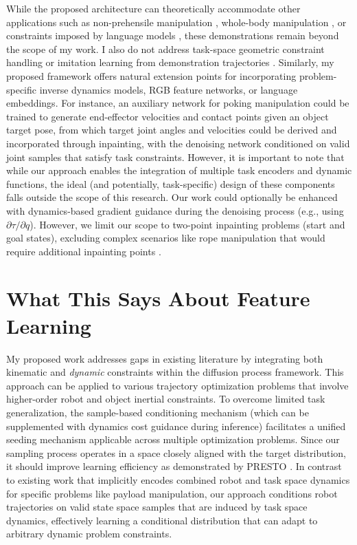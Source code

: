 While the proposed architecture can theoretically accommodate other applications such as non-prehensile manipulation \cite{pasricha2022pokerrt}, whole-body manipulation \cite{briscoe2024exploring}, or constraints imposed by language models \cite{ha2023scaling}, these demonstrations remain beyond the scope of my work. I also do not address task-space geometric constraint handling \cite{kingston2018sampling} or imitation learning from demonstration trajectories \cite{chi2023diffusion}.
Similarly, my proposed framework offers natural extension points for incorporating problem-specific inverse dynamics models, RGB feature networks, or language embeddings. For instance, an auxiliary network for poking manipulation could be trained to generate end-effector velocities and contact points given an object target pose, from which target joint angles and velocities could be derived and incorporated through inpainting, with the denoising network conditioned on valid joint samples that satisfy task constraints. However, it is important to note that while our approach enables the integration of multiple task encoders and dynamic functions, the ideal (and potentially, task-specific) design of these components falls outside the scope of this research.
Our work could optionally be enhanced with dynamics-based gradient guidance during the denoising process (e.g., using $\partial \tau / \partial q$). However, we limit our scope to two-point inpainting problems (start and goal states), excluding complex scenarios like rope manipulation that would require additional inpainting points \cite{zhang2021robots}.

\section{What This Says About Feature Learning}
\label{sec:seeding:features}

My proposed work addresses gaps in existing literature by integrating both kinematic and \textsl{dynamic} constraints within the diffusion process framework. This approach can be applied to various trajectory optimization problems that involve higher-order robot and object inertial constraints.
To overcome limited task generalization, the sample-based conditioning mechanism (which can be supplemented with dynamics cost guidance during inference) facilitates a unified seeding mechanism applicable across multiple optimization problems.
Since our sampling process operates in a space closely aligned with the target distribution, it should improve learning efficiency as demonstrated by PRESTO \cite{seo2024presto}.
In contrast to existing work that implicitly encodes combined robot and task space dynamics for specific problems like payload manipulation, our approach conditions robot trajectories on valid state space samples that are induced by task space dynamics, effectively learning a conditional distribution that can adapt to arbitrary dynamic problem constraints.

